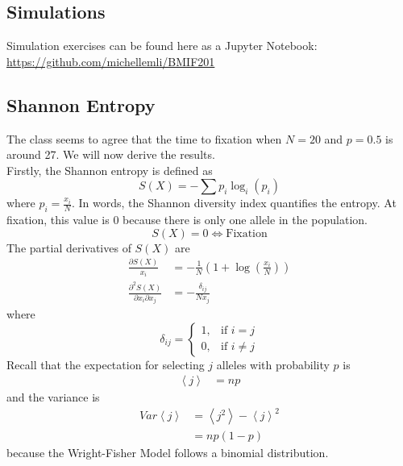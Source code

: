 \documentclass[12pt]{extarticle}
\newcommand{\<}{\langle}
\renewcommand{\>}{\rangle}
\theoremstyle{definition}
\begin{document}
\subsection{Simulations}
Simulation exercises can be found here as a Jupyter Notebook: \url{https://github.com/michellemli/BMIF201}\\

\subsection{Shannon Entropy}

The class seems to agree that the time to fixation when $N = 20$ and $p = 0.5$ is around 27. We will now derive the results.\\

\noindent Firstly, the Shannon entropy is defined as
\begin{equation}
    S(X) = -\sum p_i \log_i(p_i) \label{S_X}
\end{equation}
where $\displaystyle p_i = \frac{x_i}{N}$. In words, the Shannon diversity index quantifies the entropy. At fixation, this value is $0$ because there is only one allele in the population.
\begin{equation}
    S(X) = 0 \Longleftrightarrow \text{Fixation} \nonumber
\end{equation}
The partial derivatives of $S(X)$ are
\begin{align}
    \frac{\partial S(X)}{x_i} &= -\frac{1}{N}(1 + \log(\frac{x_i}{N})) \nonumber \\
    \frac{\partial^2 S(X)}{\partial x_i \partial x_j} &= -\frac{\delta_{ij}}{Nx_j} \label{partial^2}
\end{align}
where
\begin{equation}
    \delta_{ij} = \begin{cases}
        1, & \text{if } i = j\\
        0, & \text{if } i \neq j
    \end{cases} \label{delta}
\end{equation}
Recall that the expectation for selecting $j$ alleles with probability $p$ is
\begin{align}
    \left< j \right> &= np \label{exp}
\end{align}
and the variance is
\begin{align}
    Var \left< j \right> &= \left< j^2 \right> - \left< j \right>^2 \label{var1} \\
    &= np(1-p) \label{var2}
\end{align}
because the Wright-Fisher Model follows a binomial distribution.\\
\end{document}
